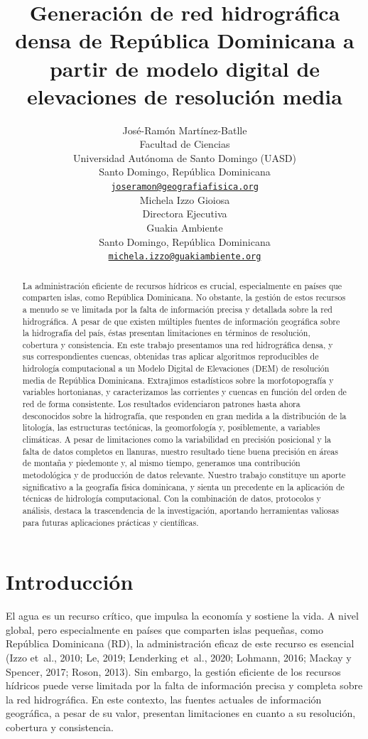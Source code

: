 \documentclass[spanish]{article}
\title{Generación de red hidrográfica densa de República Dominicana a
partir de modelo digital de elevaciones de resolución media}
\author{
    José-Ramón Martínez-Batlle\orcidlink{0000-0001-9924-0327}
   \\
    Facultad de Ciencias \\
    Universidad Autónoma de Santo Domingo (UASD) \\
  Santo Domingo, República Dominicana \\
  \texttt{\href{mailto:joseramon@geografiafisica.org}{\nolinkurl{joseramon@geografiafisica.org}}} \\
   \And
    Michela Izzo Gioiosa\orcidlink{0000-0003-4835-3967}
   \\
    Directora Ejecutiva \\
    Guakia Ambiente \\
  Santo Domingo, República Dominicana \\
  \texttt{\href{mailto:michela.izzo@guakiambiente.org}{\nolinkurl{michela.izzo@guakiambiente.org}}} \\
  }
\begin{document}
\maketitle


\begin{abstract}
La administración eficiente de recursos hídricos es crucial,
especialmente en países que comparten islas, como República Dominicana.
No obstante, la gestión de estos recursos a menudo se ve limitada por la
falta de información precisa y detallada sobre la red hidrográfica. A
pesar de que existen múltiples fuentes de información geográfica sobre
la hidrografía del país, éstas presentan limitaciones en términos de
resolución, cobertura y consistencia. En este trabajo presentamos una
red hidrográfica densa, y sus correspondientes cuencas, obtenidas tras
aplicar algoritmos reproducibles de hidrología computacional a un Modelo
Digital de Elevaciones (DEM) de resolución media de República
Dominicana. Extrajimos estadísticos sobre la morfotopografía y variables
hortonianas, y caracterizamos las corrientes y cuencas en función del
orden de red de forma consistente. Los resultados evidenciaron patrones
hasta ahora desconocidos sobre la hidrografía, que responden en gran
medida a la distribución de la litología, las estructuras tectónicas, la
geomorfología y, posiblemente, a variables climáticas. A pesar de
limitaciones como la variabilidad en precisión posicional y la falta de
datos completos en llanuras, nuestro resultado tiene buena precisión en
áreas de montaña y piedemonte y, al mismo tiempo, generamos una
contribución metodológica y de producción de datos relevante. Nuestro
trabajo constituye un aporte significativo a la geografía física
dominicana, y sienta un precedente en la aplicación de técnicas de
hidrología computacional. Con la combinación de datos, protocolos y
análisis, destaca la trascendencia de la investigación, aportando
herramientas valiosas para futuras aplicaciones prácticas y científicas.
\end{abstract}


\hypertarget{introducciuxf3n}{%
\section{Introducción}\label{introducciuxf3n}}

El agua es un recurso crítico, que impulsa la economía y sostiene la
vida. A nivel global, pero especialmente en países que comparten islas
pequeñas, como República Dominicana (RD), la administración eficaz de
este recurso es esencial (Izzo et~al., 2010; Le, 2019; Lenderking
et~al., 2020; Lohmann, 2016; Mackay y Spencer, 2017; Roson, 2013). Sin
embargo, la gestión eficiente de los recursos hídricos puede verse
limitada por la falta de información precisa y completa sobre la red
hidrográfica. En este contexto, las fuentes actuales de información
geográfica, a pesar de su valor, presentan limitaciones en cuanto a su
resolución, cobertura y consistencia.
\end{document}
